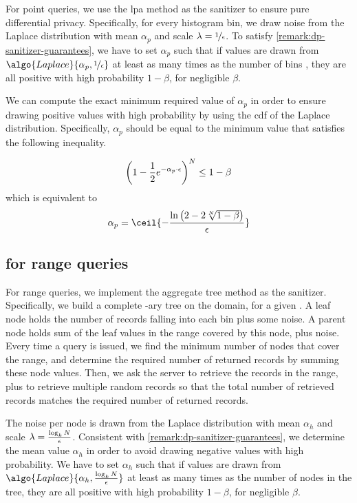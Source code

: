		For point queries, we use the \acrshort{lpa} method as the sanitizer to ensure pure differential privacy.
		Specifically, for every histogram bin, we draw noise from the Laplace distribution with mean $\alpha_p$ and scale $\lambda = \nicefrac{1}{\epsilon}$.
		To satisfy \cref{remark:dp-sanitizer-guarantees}, we have to set $\alpha_p$ such that if values are drawn from $\algo{Laplace}{ \alpha_p, \nicefrac{1}{\epsilon} }$ at least as many times as the number of bins \domainSize{}, they are all positive with high probability $1 - \beta$, for negligible $\beta$.

		We can compute the exact minimum required value of $\alpha_p$ in order to ensure drawing positive values with high probability by using the \acrshort{cdf} of the Laplace distribution.
		Specifically, $\alpha_p$ should be equal to the minimum value that satisfies the following inequality.

		\[
			\left( 1 - \frac{1}{2} e^{- \alpha_p \cdot \epsilon} \right)^{N} \leq 1 - \beta
		\]
		which is equivalent to
		\[
			\alpha_p = \ceil{ -\frac{ \ln \left( 2 - 2 \sqrt[\domainSize]{1 - \beta} \right) }{ \epsilon } }
		\]

	

	\subsection{\texorpdfstring{\epsolute{}}{Epsolute} for range queries}\label{section:dp-oram:range}

		For range queries, we implement the aggregate tree method as the sanitizer.
		Specifically, we build a complete \fanout{}-ary tree on the domain, for a given \fanout{}.
		A leaf node holds the number of records falling into each bin plus some noise.
		A parent node holds sum of the leaf values in the range covered by this node, plus noise.
		Every time a query is issued, we find the minimum number of nodes that cover the range, and determine the required number of returned records by summing these node values.
		Then, we ask the server to retrieve the records in the range, plus to retrieve multiple random records so that the total number of retrieved records matches the required number of returned records.

		The noise per node is drawn from the Laplace distribution with mean $\alpha_h$ and scale $\lambda = \frac{\log_{k} N}{\epsilon}$.
		Consistent with \cref{remark:dp-sanitizer-guarantees}, we determine the mean value $\alpha_h$ in order to avoid drawing negative values with high probability.
		We have to set $\alpha_h$ such that if values are drawn from $\algo{Laplace}{ \alpha_h, \frac{\log_{\fanout} \domainSize}{\epsilon} }$ at least as many times as the number of nodes in the tree, they are all positive with high probability $1 - \beta$, for negligible $\beta$.

